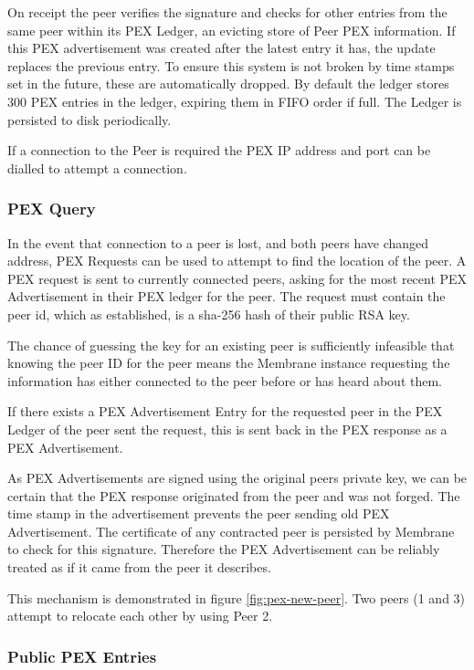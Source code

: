 \documentclass[11pt, a4paper, twocolumn, twoside]{report}
\begin{document}
On receipt the peer verifies the signature and checks for other entries from the same peer within its PEX Ledger, an evicting store of Peer PEX information. If this PEX advertisement was created after the latest entry it has, the update replaces the previous entry. To ensure this system is not broken by time stamps set in the future, these are automatically dropped. By default the ledger stores 300 PEX entries in the ledger, expiring them in FIFO order if full. The Ledger is persisted to disk periodically.

If a connection to the Peer is required the PEX IP address and port can be dialled to attempt a connection.

\subsubsection{PEX Query}

In the event that connection to a peer is lost, and both peers have changed address, PEX Requests can be used to attempt to find the location of the peer. A PEX request is sent to currently connected peers, asking for the most recent PEX Advertisement in their PEX ledger for the peer. The request must contain the peer id, which as established, is a sha-256 hash of their public RSA key.

The chance of guessing the key for an existing peer is sufficiently infeasible that knowing the peer ID for the peer means the Membrane instance requesting the information has either connected to the peer before or has heard about them.

If there exists a PEX Advertisement Entry for the requested peer in the PEX Ledger of the peer sent the request, this is sent back in the PEX response as a PEX Advertisement.

As PEX Advertisements are signed using the original peers private key, we can be certain that the PEX response originated from the peer and was not forged. \citep{li1993remark} The time stamp in the advertisement prevents the peer sending old PEX Advertisement. The certificate of any contracted peer is persisted by Membrane to check for this signature. Therefore the PEX Advertisement can be reliably treated as if it came from the peer it describes.

This mechanism is demonstrated in figure \ref{fig:pex-new-peer}. Two peers (1 and 3) attempt to relocate each other by using Peer 2.

\subsubsection{Public PEX Entries}
\end{document}
